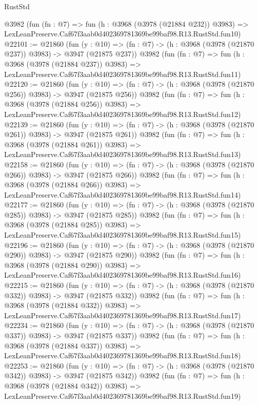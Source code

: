\begin{lexlean}{RustStd}
\begin{coremodule}
    @3982
    (fun (fn : @7) =>
    fun (h : @3968 (@3978 (@21884 @232)) @3983) =>
    LexLeanPreserve.Caf67f3aab0d402369781369be99baf98.R13.RustStd.fun10)
@22101 := @21860
    (fun (y : @10) => (fn : @7) -> (h : @3968 (@3978 (@21870 @237)) @3983) -> @3947 (@21875 @237))
    @3982
    (fun (fn : @7) =>
    fun (h : @3968 (@3978 (@21884 @237)) @3983) =>
    LexLeanPreserve.Caf67f3aab0d402369781369be99baf98.R13.RustStd.fun11)
@22120 := @21860
    (fun (y : @10) => (fn : @7) -> (h : @3968 (@3978 (@21870 @256)) @3983) -> @3947 (@21875 @256))
    @3982
    (fun (fn : @7) =>
    fun (h : @3968 (@3978 (@21884 @256)) @3983) =>
    LexLeanPreserve.Caf67f3aab0d402369781369be99baf98.R13.RustStd.fun12)
@22139 := @21860
    (fun (y : @10) => (fn : @7) -> (h : @3968 (@3978 (@21870 @261)) @3983) -> @3947 (@21875 @261))
    @3982
    (fun (fn : @7) =>
    fun (h : @3968 (@3978 (@21884 @261)) @3983) =>
    LexLeanPreserve.Caf67f3aab0d402369781369be99baf98.R13.RustStd.fun13)
@22158 := @21860
    (fun (y : @10) => (fn : @7) -> (h : @3968 (@3978 (@21870 @266)) @3983) -> @3947 (@21875 @266))
    @3982
    (fun (fn : @7) =>
    fun (h : @3968 (@3978 (@21884 @266)) @3983) =>
    LexLeanPreserve.Caf67f3aab0d402369781369be99baf98.R13.RustStd.fun14)
@22177 := @21860
    (fun (y : @10) => (fn : @7) -> (h : @3968 (@3978 (@21870 @285)) @3983) -> @3947 (@21875 @285))
    @3982
    (fun (fn : @7) =>
    fun (h : @3968 (@3978 (@21884 @285)) @3983) =>
    LexLeanPreserve.Caf67f3aab0d402369781369be99baf98.R13.RustStd.fun15)
@22196 := @21860
    (fun (y : @10) => (fn : @7) -> (h : @3968 (@3978 (@21870 @290)) @3983) -> @3947 (@21875 @290))
    @3982
    (fun (fn : @7) =>
    fun (h : @3968 (@3978 (@21884 @290)) @3983) =>
    LexLeanPreserve.Caf67f3aab0d402369781369be99baf98.R13.RustStd.fun16)
@22215 := @21860
    (fun (y : @10) => (fn : @7) -> (h : @3968 (@3978 (@21870 @332)) @3983) -> @3947 (@21875 @332))
    @3982
    (fun (fn : @7) =>
    fun (h : @3968 (@3978 (@21884 @332)) @3983) =>
    LexLeanPreserve.Caf67f3aab0d402369781369be99baf98.R13.RustStd.fun17)
@22234 := @21860
    (fun (y : @10) => (fn : @7) -> (h : @3968 (@3978 (@21870 @337)) @3983) -> @3947 (@21875 @337))
    @3982
    (fun (fn : @7) =>
    fun (h : @3968 (@3978 (@21884 @337)) @3983) =>
    LexLeanPreserve.Caf67f3aab0d402369781369be99baf98.R13.RustStd.fun18)
@22253 := @21860
    (fun (y : @10) => (fn : @7) -> (h : @3968 (@3978 (@21870 @342)) @3983) -> @3947 (@21875 @342))
    @3982
    (fun (fn : @7) =>
    fun (h : @3968 (@3978 (@21884 @342)) @3983) =>
    LexLeanPreserve.Caf67f3aab0d402369781369be99baf98.R13.RustStd.fun19)

\end{coremodule}
\end{lexlean}
